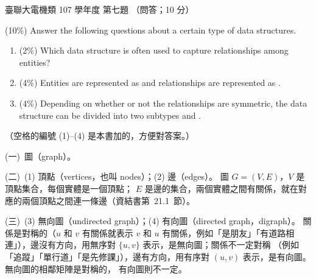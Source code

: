 \begin{pastexam}[label={px:ust-107-ee-ds-07}]{臺聯大電機類 107 學年度 第七題}
（問答；10 分）

(10\%) Answer the following questions about a certain type of data structures.
\begin{enumerate}
\item[(一)] (2\%) Which data structure is often used to capture relationships among entities?
\item[(二)] (4\%) Entities are represented as  and relationships are represented as .
\item[(三)] (4\%) Depending on whether or not the relationships are symmetric, the data structure can be divided into two subtypes  and .
\end{enumerate}
\end{pastexam}

\begin{pastsoln}
（空格的編號 (1)--(4) 是本書加的，方便對答案。）

(一)~圖（graph）。

(二)~(1) 頂點（vertices，也叫 nodes）；(2) 邊（edges）。 圖 $G = (V, E)$，$V$ 是頂點集合，每個實體是一個頂點；
$E$ 是邊的集合，兩個實體之間有關係，就在對應的兩個頂點之間連一條邊（資結書第~21.1~節）。

(三)~(3) 無向圖（undirected graph）；(4) 有向圖（directed graph，digraph）。 關係是對稱的（$u$ 和 $v$ 有關係就表示
$v$ 和 $u$ 有關係，例如「是朋友」「有道路相連」），邊沒有方向，用無序對 $\{u, v\}$ 表示，是無向圖；關係不一定對稱
（例如「追蹤」「單行道」「是先修課」），邊有方向，用有序對 $(u, v)$ 表示，是有向圖。 無向圖的相鄰矩陣是對稱的，
有向圖則不一定。
\end{pastsoln}
